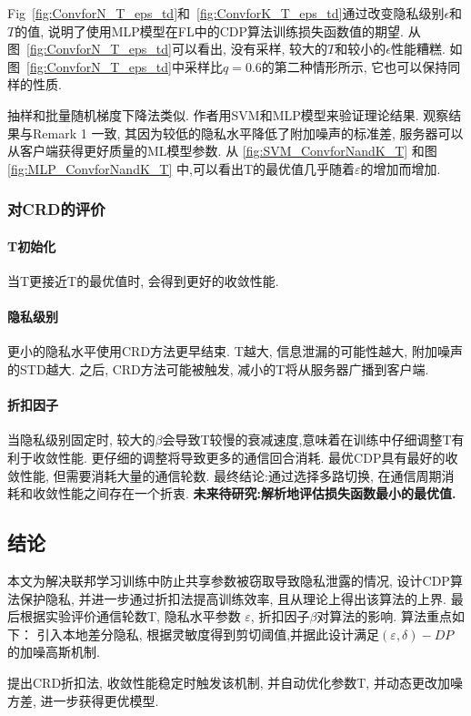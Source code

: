 Fig~\ref{fig:ConvforN_T_eps_td}和~\ref{fig:ConvforK_T_eps_td}通过改变隐私级别$\epsilon$和$T$的值, 说明了使用MLP模型在FL中的CDP算法训练损失函数值的期望. 从图~\ref{fig:ConvforN_T_eps_td}可以看出, 没有采样, 较大的$T$和较小的$\epsilon$性能糟糕. 如图~\ref{fig:ConvforN_T_eps_td}中采样比$q=0.6$的第二种情形所示, 它也可以保持同样的性质. 

抽样和批量随机梯度下降法类似.
作者用SVM和MLP模型来验证理论结果.  观察结果与Remark 1 一致, 其因为较低的隐私水平降低了附加噪声的标准差, 服务器可以从客户端获得更好质量的ML模型参数. 从 \ref{fig:SVM_ConvforNandK_T} 和图\ref{fig:MLP_ConvforNandK_T} 中,可以看出T的最优值几乎随着$\varepsilon$的增加而增加. 

 
\subsubsection{对CRD的评价}
\paragraph{T初始化}
当T更接近T的最优值时, 会得到更好的收敛性能.
\paragraph{隐私级别}
更小的隐私水平使用CRD方法更早结束. T越大, 信息泄漏的可能性越大, 附加噪声的STD越大. 之后, CRD方法可能被触发, 减小的T将从服务器广播到客户端. 
\paragraph{折扣因子} 当隐私级别固定时, 较大的$\beta$会导致T较慢的衰减速度,意味着在训练中仔细调整T有利于收敛性能. 更仔细的调整将导致更多的通信回合消耗. 最优CDP具有最好的收敛性能, 但需要消耗大量的通信轮数. 最终结论:通过选择多路切换, 在通信周期消耗和收敛性能之间存在一个折衷.  
\textbf{未来待研究:解析地评估损失函数最小的最优值. }

\subsection{结论}
本文为解决联邦学习训练中防止共享参数被窃取导致隐私泄露的情况, 设计CDP算法保护隐私, 并进一步通过折扣法提高训练效率, 且从理论上得出该算法的上界. 最后根据实验评价通信轮数T, 隐私水平参数 $\varepsilon$, 折扣因子$\beta$对算法的影响. 
算法重点如下：
引入本地差分隐私, 根据灵敏度得到剪切阈值,并据此设计满足$(\varepsilon,\delta)-DP$的加噪高斯机制. 

提出CRD折扣法, 收敛性能稳定时触发该机制, 并自动优化参数T, 并动态更改加噪方差, 进一步获得更优模型. 









